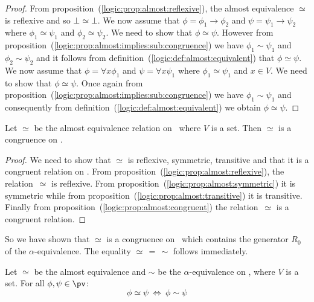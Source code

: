 \noindent
\begin{proof}
From proposition~(\ref{logic:prop:almost:reflexive}), the almost
equivalence $\simeq$ is reflexive and so $\bot\simeq\bot$. We now
assume that $\phi=\phi_{1}\to\phi_{2}$ and
$\psi=\psi_{1}\to\psi_{2}$ where $\phi_{1}\simeq\psi_{1}$ and
$\phi_{2}\simeq\psi_{2}$. We need to show that $\phi\simeq\psi$.
However from
proposition~(\ref{logic:prop:almost:implies:sub:congruence}) we have
$\phi_{1}\sim\psi_{1}$ and $\phi_{2}\sim\psi_{2}$ and it follows
from definition~(\ref{logic:def:almost:equivalent}) that
$\phi\simeq\psi$. We now assume that $\phi=\forall x\phi_{1}$ and
$\psi=\forall x\psi_{1}$ where $\phi_{1}\simeq\psi_{1}$ and $x\in
V$. We need to show that $\phi\simeq\psi$. Once again from
proposition~(\ref{logic:prop:almost:implies:sub:congruence}) we have
$\phi_{1}\sim\psi_{1}$ and consequently from
definition~(\ref{logic:def:almost:equivalent}) we obtain
$\phi\simeq\psi$.
\end{proof}

\begin{prop}\label{logic:prop:almost:congruence}
Let $\simeq$ be the almost equivalence relation on \pv\ where $V$ is
a set. Then $\simeq$ is a congruence on \pv.
\end{prop}


\noindent
\begin{proof}
We need to show that $\simeq$ is reflexive, symmetric, transitive
and that it is a congruent relation on \pv. From
proposition~(\ref{logic:prop:almost:reflexive}), the
relation~$\simeq$ is reflexive. From
proposition~(\ref{logic:prop:almost:symmetric}) it is symmetric
while from proposition~(\ref{logic:prop:almost:transitive}) it is
transitive. Finally from
proposition~(\ref{logic:prop:almost:congruent}) the
relation~$\simeq$ is a congruent relation.
\end{proof}

So we have shown that $\simeq$ is a congruence on \pv\ which
contains the generator $R_{0}$ of the $\alpha$-equivalence. The
equality $\simeq\,=\,\sim$ follows immediately.

\begin{prop}\label{logic:prop:almost:is:sub:congruence}
Let $\simeq$ be the almost equivalence and $\sim$ be the 
$\alpha$-equivalence on \pv, where $V$ is a set. For all
$\phi,\psi\in\pv$:
    \[
    \phi\simeq\psi\ \Leftrightarrow\ \phi\sim\psi
    \]
\end{prop}

